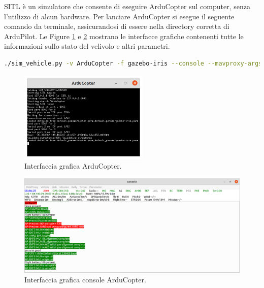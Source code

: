 \ac{SITL} \cite{sitl} è un simulatore che consente di eseguire ArduCopter sul computer, senza l'utilizzo di alcun hardware. Per lanciare ArduCopter si esegue il seguente comando da terminale, assicurandosi di essere nella directory corretta di ArduPilot. Le Figure \ref{fig:arduCopter} e \ref{fig:consArduCopter} mostrano le interfacce grafiche contenenti tutte le informazioni sullo stato del velivolo e altri parametri.\\

\begin{lstlisting}[language=bash, numbers=none]
  ./sim_vehicle.py -v ArduCopter -f gazebo-iris --console --mavproxy-args="--streamrate=100"
\end{lstlisting}

\begin{figure}[H]
	\centering
	\includegraphics[width=0.55\textwidth]{gfx/ROS/ArduCopter}
	\caption[Interfaccia grafica ArduCopter.]{Interfaccia grafica ArduCopter.}
	\label{fig:arduCopter}
\end{figure}

\begin{figure}[H]
	\centering
	\includegraphics[width=1\textwidth]{gfx/ROS/SITL}
	\caption[Interfaccia grafica console ArduCopter.]{Interfaccia grafica console ArduCopter.}
	\label{fig:consArduCopter}
\end{figure}


